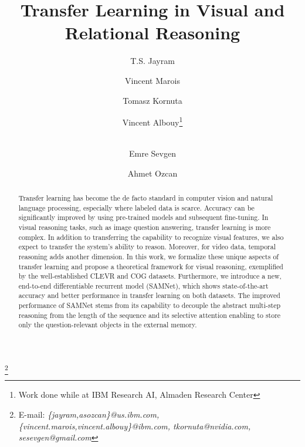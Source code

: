 \documentclass[11pt]{article}
\begin{document}
\title{Transfer Learning in Visual and Relational Reasoning}

\renewcommand\Authands{ and }
\author[1]{T.S. Jayram}
\author[2]{Vincent Marois}
\author[3]{Tomasz Kornuta}
\author[ ]{Vincent Albouy\thanks{Work done while at IBM Research AI, Almaden Research Center}}
\author[*]{\\Emre Sevgen}
\author[1]{Ahmet Ozcan}

\date{}

\maketitle
\newcommand\blfootnote[1]{%
	\begingroup
	\renewcommand\thefootnote{}\footnote{#1}%
	\addtocounter{footnote}{-1}%
	\endgroup
}

\blfootnote{E-mail: {\scriptsize \textit{\{jayram,asozcan\}@us.ibm.com,  \{vincent.marois,vincent.albouy\}@ibm.com, tkornuta@nvidia.com, sesevgen@gmail.com}}}

\begin{abstract}
	Transfer learning has become the de facto standard in computer vision and natural language processing, especially where labeled data is scarce. Accuracy can be significantly improved by using pre-trained models and subsequent fine-tuning. In visual reasoning tasks, such as image question answering, transfer learning is more complex. In addition to transferring the capability to recognize visual features, we also expect to transfer the system's ability to reason. Moreover, for video data, temporal reasoning adds another dimension. In this work, we formalize these unique aspects of transfer learning and propose a theoretical framework for visual reasoning, exemplified by the well-established CLEVR and COG datasets. Furthermore, we introduce a new, end-to-end differentiable recurrent model (SAMNet), which shows state-of-the-art accuracy and better performance in transfer learning on both datasets. The improved performance of SAMNet stems from its capability to decouple the abstract multi-step reasoning from the length of the sequence and its selective attention enabling to store only the question-relevant objects in the external memory.
\end{abstract}

















\newpage
\appendix


\end{document}
